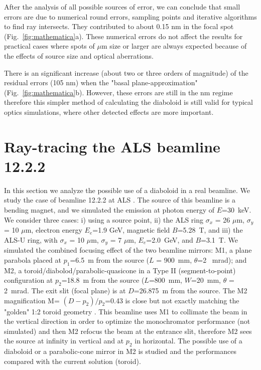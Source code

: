 \documentclass{iucr}              %
\newcommand{\inred}[1]{{\color{red}#1}}
\begin{document}
\inred{After the analysis of all possible sources of error, we can conclude that small errors are due to numerical round errors, sampling points and iterative algorithms to find ray intersects. They contributed to about 0.15 nm in the focal spot (Fig.~\ref{fig:mathematica}a).}
These numerical errors do not affect the results for practical cases where spots of $\mu$m size or larger are always expected because of the effects of source size and optical aberrations. 


There is an significant increase (about two or three orders of magnitude) of the residual errors (105 nm) when the "basal plane-approximation" (Fig.~\ref{fig:mathematica}b). However, these errors are still in the nm regime therefore this simpler method of calculating the diaboloid is still valid for typical optics simulations, where other detected effects are more important.


\section{Ray-tracing the ALS beamline 12.2.2}
\label{sec:beamline}

In this section we analyze the possible use of a diaboloid in a real beamline. We study the case of beamline 12.2.2  at ALS \cite{bl1222} \cite{MacDowell2004}. The source of this beamline is a bending magnet, and we simulated the emission at photon energy of $E$=30~keV. We consider three cases: i) using a source point, ii) the ALS ring
$\sigma_x$ = 26 $\mu$m, $\sigma_y$ = 10 $\mu$m, electron energy $E_e$=1.9 GeV, magnetic field $B$=5.28~T, and iii) the ALS-U ring, with $\sigma_x$ = 10 $\mu$m, $\sigma_y$ = 7 $\mu$m, $E_e$=2.0~GeV, and $B$=3.1~T. We simulated the combined focusing effect of the two beamline mirrors: M1, a plane parabola placed at $p_1$=6.5~m from the source ($L$ = 900~mm, $\theta$=2 ~mrad); and M2, a toroid/diabolod/parabolic-quasicone in a Type II (segment-to-point) configuration at $p_2$=18.8~m from the source ($L$=800~mm, $W$=20~mm, $\theta$ = 2~mrad. The exit slit (focal plane) is at $D$=26.875~m from the source.  The M2 magnification M= $(D-p_2)/p_2$=0.43 is close but not exactly matching the "golden" 1:2 toroid geometry \cite{padmore2000, howells2000}. This beamline uses M1 to collimate the beam in the vertical direction in order to optimize the monochromator performance (not simulated) and then M2 refocus the beam at the entrance slit, therefore M2 sees the source at infinity in vertical and at $p_2$ in horizontal. The possible use of a diaboloid or a parabolic-cone mirror in M2 is studied and the performances compared with the current solution (toroid).
\end{document}
